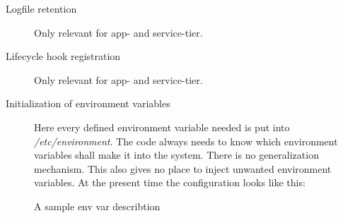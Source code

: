 \begin{description}
				\item[Logfile retention] Only relevant for app- and service-tier.
				\item[Lifecycle hook registration] Only relevant for app- and service-tier.

				\item[Initialization of environment variables] Here every defined environment variable needed is put into \emph{/etc/environment}. The code always needs to know which environment variables shall make it into the system. There is no generalization mechanism. This also gives no place to inject unwanted environment variables. At the present time the configuration looks like this:
				\begin{listing}[H]
					\caption{A sample env var describtion}
					\label{lst:p01:ch01:linhost_env_var_descr}
					\inputminted{yaml}{\relative{chapter_01/section_3.2/env_var_description_example.yaml}}
				\end{listing}
			\end{description}

